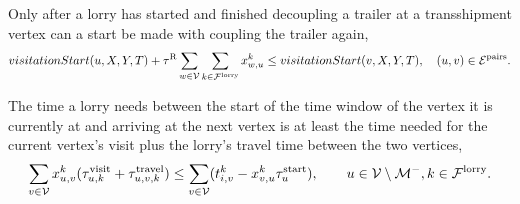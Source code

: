 
Only after a lorry has started and finished decoupling a trailer at a transshipment vertex can a start be made with coupling the trailer again,  
%
\begin{align}
  visitationStart(u, X,Y, T) +
  \tau^{\rm R}   \sum_{w \in \mathcal V} \sum_{k \in \mathcal F^{\rm lorry}} x^k_{w,u}   
  \leq
  visitationStart(v, X,Y, T) ,
  \quad (u,v) \in \mathcal E^{\rm pairs}.
\end{align}





The time a lorry needs  between the start of the time window of the vertex it is currently at and arriving at the next vertex is at least the time needed for the current vertex's visit plus the lorry's travel time between the two vertices,
\begin{align}
  \sum_{v \in \mathcal V} x_{u,v}^k (\tau_{u,k}^{\rm visit} + \tau_{u,v,k}^{\rm travel}) \leq \sum_{v \in \mathcal V} (t_{i,v}^k - x^k_{v,u} \tau_u^{\rm start}),
  \qquad u\in \mathcal V \setminus \mathcal M^- , k \in \mathcal{F}^{\rm lorry}.
\end{align}





